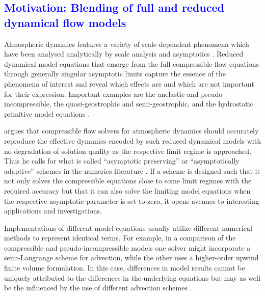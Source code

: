 \documentclass{ametsoc}
\theoremstyle{definition}
\newcommand{\klein}[1]{\textcolor{blue}{#1}}
\begin{document}

\subsection{\klein{Motivation: Blending of full and reduced dynamical flow models}}

Atmospheric dynamics features a variety of scale-dependent phenomena which have been analysed analytically by scale analysis and asymptotics \citep[see, e.g.,][and references therein]{Pedlosky1992,Klein2010}. Reduced dynamical model equations that emerge from the full compressible flow equations through generally singular asymptotic limits capture the essence of the phenomena of interest and reveal which effects are and which are not important for their expression. Important examples are the anelastic and pseudo-incompressible, the quasi-geostrophic and semi-geostrophic, and the hydrostatic primitive model equations \citep[see][for references]{HoskinsBretherton1972,LippsHemler1982,Durran1989,Pedlosky1992,Bannon1996,CullenMaroofi2003,Klein2010}. 

\citet{Cullen2007} argues that compressible flow solvers for atmospheric dynamics should  accurately reproduce the effective dynamics encoded by such reduced dynamical models with no degradation of solution quality as the respective limit regime is approached. Thus he calls for what is called ``asymptotic preserving'' or ``asymptotically adaptive'' schemes in the numerics literature \citep[see][for references]{KleinEtal2001,Jin2012}. If a scheme is designed such that it not only solves the compressible equations close to some limit regimes with the required accuracy but that it can also solve the limiting model equations when the respective asymptotic parameter is set to zero, it opens avenues to interesting applications and investigations.

Implementations of different model equations usually utilize different numerical methods to represent identical terms. For example, in a comparison of the compressible and pseudo-incompressible models one solver might incorporate a semi-Langrange scheme for advection, while the other uses a higher-order upwind finite volume formulation. In this case, differences in model results cannot be uniquely attributed to the differences in the underlying equations but may as well be the influenced by the use of different advection schemes \citep[See][for further examples]{SmolarkiewiczDoernbrack2007,BenacchioEtAl2014}.
\end{document}
